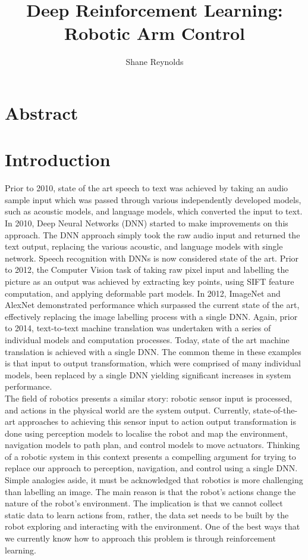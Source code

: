 \documentclass[a4paper]{article}
\begin{document}
\title{Deep Reinforcement Learning: Robotic Arm Control}
\author{Shane Reynolds}
\maketitle

\section*{Abstract}



\section{Introduction}
Prior to 2010, state of the art speech to text was achieved by taking an audio sample input which was passed through various independently developed models, such as acoustic models, and language models, which converted the input to text. In 2010, Deep Neural Networks (DNN) started to make improvements on this approach. The DNN approach simply took the raw audio input and returned the text output, replacing the various acoustic, and language models with single network. Speech recognition with DNNs is now considered state of the art. Prior to 2012, the Computer Vision task of taking raw pixel input and labelling the picture as an output was achieved by extracting key points, using SIFT feature computation, and applying deformable part models. In 2012, ImageNet and AlexNet demonstrated performance which surpassed the current state of the art, effectively replacing the image labelling process with a single DNN. Again, prior to 2014, text-to-text machine translation was undertaken with a series of individual models and computation processes. Today, state of the art machine translation is achieved with a single DNN. The common theme in these examples is that input to output transformation, which were comprised of many individual models, been replaced by a single DNN yielding significant increases in system performance.\\

The field of robotics presents a similar story: robotic sensor input is processed, and actions in the physical world are the system output. Currently, state-of-the-art approaches to achieving this sensor input to action output transformation is done using perception models to localise the robot and map the environment, navigation models to path plan, and control models to move actuators. Thinking of a robotic system in this context presents a compelling argument for trying to replace our approach to perception, navigation, and control using a single DNN. Simple analogies aside, it must be acknowledged that robotics is more challenging than labelling an image. The main reason is that the robot's actions change the nature of the robot's environment. The implication is that we cannot collect static data to learn actions from, rather, the data set needs to be built by the robot exploring and interacting with the environment. One of the best ways that we currently know how to approach this problem is through reinforcement learning.
 
\end{document}
